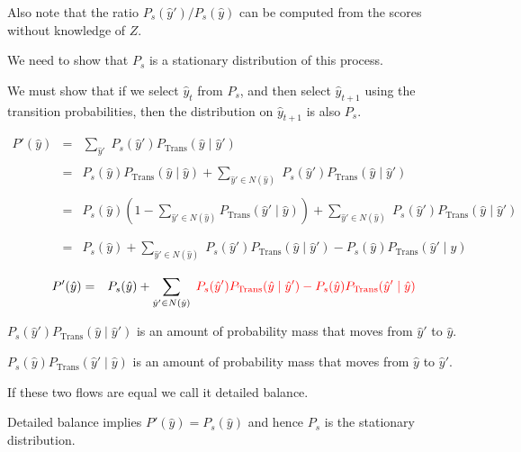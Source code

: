 {\vfill
Also note that the ratio $P_s(\hat{y}')/P_s(\hat{y})$ can be computed from the scores without knowledge of $Z$.

We need to show that $P_s$ is a stationary distribution of this process.

\vfill
We must show that if we select $\hat{y}_t$ from $P_s$, and then select $\hat{y}_{t+1}$ using the transition probabilities,
then the distribution on $\hat{y}_{t+1}$ is also $P_s$.


{\huge
\begin{eqnarray*}
P'(\hat{y}) & = & \sum_{\hat{y}'}\;P_s(\hat{y}')P_{\mathrm{Trans}}(\hat{y}\;|\;\hat{y}') \\
\\
& = & P_s(\hat{y})P_{\mathrm{Trans}}(\hat{y}\;|\;\hat{y}) + \sum_{\hat{y}' \in N(\hat{y})}\;P_s(\hat{y}')P_{\mathrm{Trans}}(\hat{y}\;|\;\hat{y}') \\
\\
& = & P_s(\hat{y})\left(1 - \sum_{\hat{y}' \in N(\hat{y})} P_{\mathrm{Trans}}(\hat{y}'\;|\;\hat{y})\right) + \sum_{\hat{y}' \in N(\hat{y})}\;P_s(\hat{y}')P_{\mathrm{Trans}}(\hat{y}\;|\;\hat{y}') \\
\\
\\
& = & P_s(\hat{y}) + \sum_{\hat{y}' \in N(\hat{y})}\;P_s(\hat{y}')P_{\mathrm{Trans}}(\hat{y}\;|\;\hat{y}') - P_s(\hat{y})P_{\mathrm{Trans}}(\hat{y}'\;|\;\hat{y})
\end{eqnarray*}
}


{\huge
\begin{eqnarray*}
P'(\hat{y}) & = & P_s(\hat{y}) + \sum_{\hat{y}' \in N(\hat{y})}\;{\color{red} P_s(\hat{y}')P_{\mathrm{Trans}}(\hat{y}\;|\;\hat{y}') - P_s(\hat{y})P_{\mathrm{Trans}}(\hat{y}'\;|\;\hat{y})}
\end{eqnarray*}
}

\vfill
{\color{red} $P_s(\hat{y}')P_{\mathrm{Trans}}(\hat{y}\;|\;\hat{y}')$} is an amount of probability mass that moves from $\hat{y}'$ to $\hat{y}$.

\vfill
{\color{red} $P_s(\hat{y})P_{\mathrm{Trans}}(\hat{y}'\;|\;\hat{y})$} is an amount of probability mass that moves from $\hat{y}$ to $\hat{y}'$.

\vfill
If these two flows are equal we call it {\color{red} detailed balance}.

\vfill
Detailed balance implies {\color{red} $P'(\hat{y}) = P_s(\hat{y})$} and hence $P_s$ is the stationary distribution.

}
